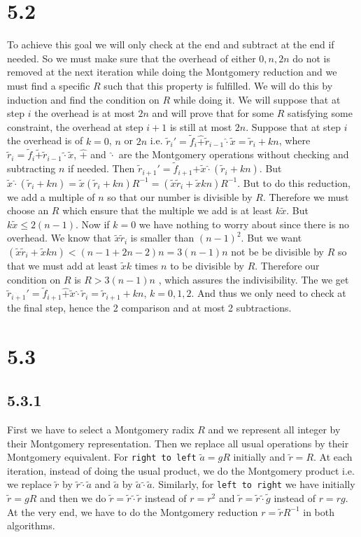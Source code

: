 \documentclass[12pt,a4paper]{article}
\newcommand {\mprod}{\tilde{\cdot}}
\newcommand {\nmprod}{\hat{\cdot}}
\newcommand {\nmsum}{\hat{+}}
\begin{document}
    \section*{5.2}
    To achieve this goal we will only check at the end and subtract at the end if needed. So we must make sure that the overhead of either $0,n,2n$ do not is removed at 
    the next iteration while doing the Montgomery reduction and we 
    must find a specific $R$ such that this property is fulfilled. We will do this by induction and find the condition on $R$ while doing it. 
    We will suppose that at step $i$ the overhead is at most $2n$ and will prove that for some $R$ satisfying some constraint, the overhead at step $i+1$ is still at most $2n$.
    Suppose that at step
    $i$ the overhead is of $k = 0$, $n$ or $2n$ i.e. $\tilde{r}_i' = \tilde{f}_i \nmsum \tilde{r}_{i-1} \nmprod \tilde{x} = \tilde{r}_i + kn$, 
    where $\tilde{r}_i = \tilde{f}_i \tilde{+} \tilde{r}_{i-1}\tilde{\cdot}\tilde{x} $,
    $\nmsum$ and $\nmprod$ are the Montgomery operations without checking and subtracting $n$ if needed.
    Then $\tilde{r}_{i+1}' = \tilde{f}_{i+1} \nmsum \tilde{x} \nmprod (\tilde{r}_i + kn)$. 
    But $\tilde{x} \nmprod (\tilde{r}_i + kn) = \tilde{x}(\tilde{r}_i +kn)R^{-1} = (\tilde{x}\tilde{r}_i + \tilde{x}kn)R^{-1}$.
    But to do this reduction, we add a multiple of $n$ so that our number is divisible by $R$. Therefore we must choose an $R$ which ensure that the multiple we add is at least $k\tilde{x}$.
    But $k\tilde{x} \leq 2(n-1)$. Now if $k = 0$ we have nothing to worry about since there is no overhead. We know that $\tilde{x}\tilde{r}_i$ is smaller than $(n-1)^2$.
    But we want $(\tilde{x}\tilde{r}_i + \tilde{x}kn) <  (n-1 + 2n - 2)n = 3(n - 1)n$ not be be divisible by $R$ so that we must add at least $\tilde{x}k$ times $n$ to be divisible by $R$.
    Therefore our condition on $R$ is $R > 3(n -1)n$ , which assures the indivisibility. 
    The we get $\tilde{r}_{i+1}' = \tilde{f}_{i+1} \nmsum \tilde{x} \nmprod \tilde{r}_{i}
    = \tilde{r}_{i+1} + kn$, $k=0,1,2$.
    And thus we only need to check at the final step, hence the 2 comparison and at most 2 subtractions.

    \section*{5.3}
    \subsection*{5.3.1}
    First we have to select a Montgomery radix $R$ and we represent all integer by their Montgomery representation.
    Then we replace all usual operations by their Montgomery equivalent.
    For \texttt{right to left} $\tilde{a} = gR$ initially and $\tilde{r} = R$. At each iteration, instead of doing the usual product, we do the Montgomery product
    i.e. we replace $\tilde{r}$ by $\tilde{r} \mprod \tilde{a}$ and $\tilde{a}$ by $\tilde{a} \mprod \tilde{a}$.
    Similarly, for \texttt{left to right} we have initially $\tilde{r} = gR$  and  then we do $\tilde{r} = \tilde{r} \mprod \tilde{r}$ 
    instead of $r = r^2$ and $\tilde{r} =  \tilde{r} \mprod \tilde{g}$ instead of $r = rg$.
    At the very end, we have to do the Montgomery reduction $r = \tilde{r}R^{-1}$ in both algorithms.
\end{document}
